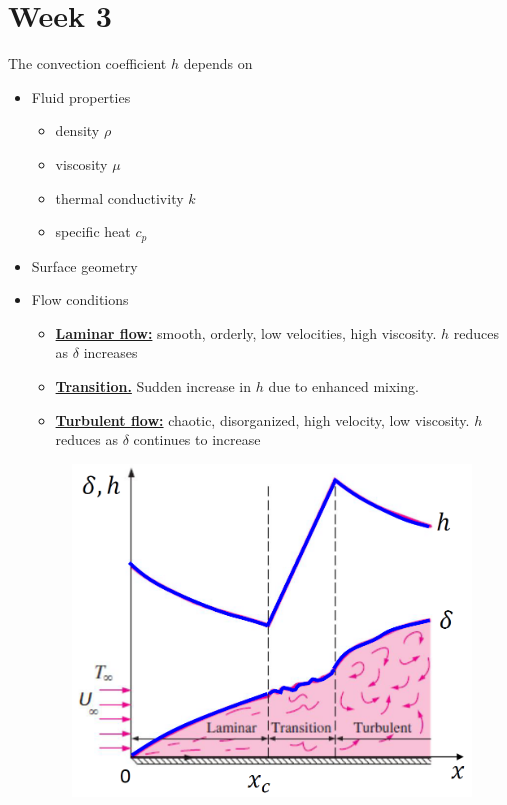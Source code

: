 \section{Week 3}
The convection coefficient $h$ depends on
\begin{itemize}
    \item \color{blue}Fluid properties\color{black}
    \begin{itemize}
        \item density $\rho$
        \item viscosity $\mu$
        \item thermal conductivity $k$
        \item specific heat $c_p$
    \end{itemize}
    \item \color{blue} Surface geometry
    \item Flow conditions \color{black}
    \begin{itemize}
        \item \textbf{\underline{Laminar flow:}} smooth, orderly, low velocities, high viscosity. $h$ reduces as $\delta$ increases
        \item \underline{\textbf{Transition.}} Sudden increase in $h$ due to enhanced mixing.
        \item \underline{\textbf{Turbulent flow:}} chaotic, disorganized, high velocity, low viscosity. $h$ reduces as $\delta$ continues to increase
    \end{itemize}
    \begin{figure}[H]
        \centering
        \includegraphics[width=0.8\linewidth]{images/convection_vs_Renold.png}
    \end{figure}
\end{itemize}

